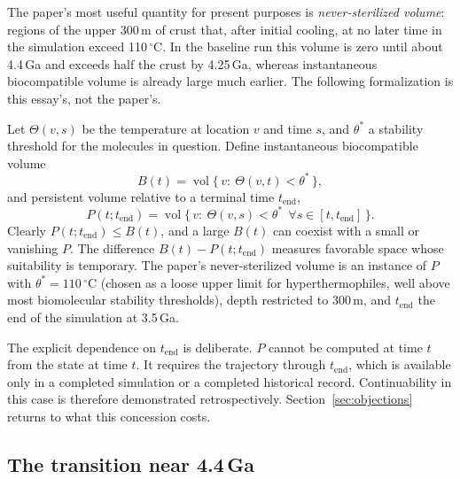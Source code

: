 \documentclass[11pt]{article}
\theoremstyle{definition}
\begin{document}
The paper's most useful quantity for present purposes is \emph{never-sterilized volume}: regions of the upper 300\,m of crust that, after initial cooling, at no later time in the simulation exceed 110\,$^\circ$C. In the baseline run this volume is zero until about 4.4\,Ga and exceeds half the crust by 4.25\,Ga, whereas instantaneous biocompatible volume is already large much earlier. The following formalization is this essay's, not the paper's.

Let $\Theta(v,s)$ be the temperature at location $v$ and time $s$, and $\theta^{*}$ a stability threshold for the molecules in question. Define instantaneous biocompatible volume
\begin{equation}
B(t)=\operatorname{vol}\{\,v:\ \Theta(v,t)<\theta^{*}\,\},
\end{equation}
and persistent volume relative to a terminal time $t_{\mathrm{end}}$,
\begin{equation}
P(t;t_{\mathrm{end}})=\operatorname{vol}\{\,v:\ \Theta(v,s)<\theta^{*}\ \ \forall s\in[t,t_{\mathrm{end}}]\,\}.
\end{equation}
Clearly $P(t;t_{\mathrm{end}})\le B(t)$, and a large $B(t)$ can coexist with a small or vanishing $P$. The difference $B(t)-P(t;t_{\mathrm{end}})$ measures favorable space whose suitability is temporary. The paper's never-sterilized volume is an instance of $P$ with $\theta^{*}=110\,^\circ$C (chosen as a loose upper limit for hyperthermophiles, well above most biomolecular stability thresholds), depth restricted to 300\,m, and $t_{\mathrm{end}}$ the end of the simulation at 3.5\,Ga.

The explicit dependence on $t_{\mathrm{end}}$ is deliberate. $P$ cannot be computed at time $t$ from the state at time $t$. It requires the trajectory through $t_{\mathrm{end}}$, which is available only in a completed simulation or a completed historical record. Continuability in this case is therefore demonstrated retrospectively. Section~\ref{sec:objections} returns to what this concession costs.

\subsection{\texorpdfstring{The transition near 4.4\,Ga}{The transition near 4.4 Ga}}
\end{document}

